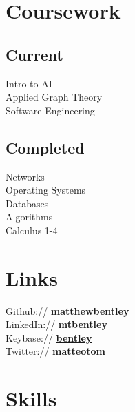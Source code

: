 \documentclass[letterpaper]{deedy-resume} %
\newcommand{\bul}{\textbullet{}}
\begin{document}
\begin{minipage}[t]{0.33\textwidth}
\section{Coursework}

\subsection{Current}

Intro to AI \\%
Applied Graph Theory \\%
Software Engineering

\sectionspace %


\subsection{Completed}

Networks \\%
Operating Systems \\%
Databases \\%
Algorithms \\%
Calculus 1-4


\sectionspace %


\section{Links}

Github:// \href{https://github.com/matthewbentley}{\bf matthewbentley} \\
LinkedIn:// \href{https://www.linkedin.com/in/mtbentley}{\bf mtbentley} \\
Keybase:// \href{https://keybase.io/bentley}{\bf bentley} \\
Twitter:// \href{https://twitter.com/matteotom}{\bf matteotom} \\

\sectionspace %


\section{Skills}


\end{minipage}
\end{document}
